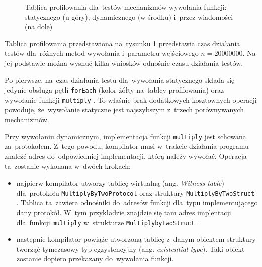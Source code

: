 \documentclass[mgr, shortabstract]{iithesis}
\newcommand{\ang}[1]{ang. \textit{#1}}
\newcommand{\swiftinline}[1]{
    \texttt{#1}
}
\begin{document}
\begin{figure}
    \caption{Tablica profilowania dla~testów mechanizmów wywołania funkcji: statycznego (u góry), dynamicznego (w środku) i~przez wiadomości (na dole)}
    \label{i:dispatch_method}
\end{figure}

Tablica profilowania przedstawiona na~rysunku \ref{i:dispatch_method} przedstawia czas działania testów dla~różnych metod wywołania i~parametru wejściowego $n = 20000000$. Na jej podstawie można wysnuć kilka wniosków odnośnie czasu działania testów.

Po pierwsze, na~czas działania testu dla~wywołania statycznego składa się jedynie obsługa pętli \swiftinline{forEach} (kolor żółty na~tablcy profilowania) oraz wywołanie funkcji \swiftinline{multiply}. To właśnie brak dodatkowych kosztownych operacji powoduje, że~wywołanie statyczne jest najszybszym z~trzech porównywanych mechanizmów.

Przy wywołaniu dynamicznym, implementacja funkcji \swiftinline{multiply} jest schowana za~protokołem. Z~tego powodu, kompilator musi w~trakcie działania programu znaleźć adres do~odpowiedniej implementacji, którą należy wywołać. Operacja ta~zostanie wykonana w~dwóch krokach:

\begin{itemize}
    \item najpierw kompilator utworzy tablicę wirtualną (\ang{Witness table}) dla~protokołu \swiftinline{MultiplyByTwoProtocol} oraz struktury \swiftinline{MultiplyByTwoStruct}. Tablica ta~zawiera odnośniki do~adresów funkcji dla~typu implementującego dany protokół. W~tym przykładzie znajdzie się tam adres implentacji dla~funkcji \swiftinline{multiply} w~strukturze \swiftinline{MultiplybyTwoStruct}.
    \item następnie kompilator powiąże utworzoną tablicę z~danym obiektem struktury tworząć tymczasowy typ egzystencyjny (\ang{existential type}). Taki obiekt zostanie dopiero przekazany do~wywołania funkcji.
\end{itemize}
\end{document}
